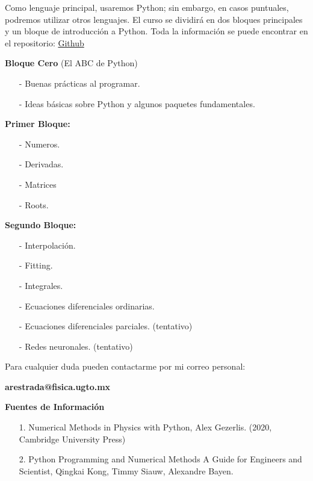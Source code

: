 \documentclass[12pt]{amsart} %
\begin{document}
Como lenguaje principal, usaremos Python; sin embargo, en casos puntuales, podremos utilizar otros lenguajes. El curso se dividirá en dos bloques principales y un bloque de introducción a Python. Toda la información se puede encontrar en el repositorio: \href{https://github.com/Mandy8808/Metodos_Numericos_2024.git}{Github}

\vspace{8pt}

\textbf{Bloque Cero} (El ABC de Python)
\begin{enumerate}
	\item[-] Buenas prácticas al programar.
	\item[-] Ideas básicas sobre Python y algunos paquetes fundamentales.
\end{enumerate}

\textbf{Primer Bloque:}
\begin{itemize}
	\item[-] Numeros.
	\item[-] Derivadas.
	\item[-] Matrices
	\item[-] Roots.
\end{itemize}

\textbf{Segundo Bloque:}
\begin{itemize}
	\item[-] Interpolación.
	\item[-] Fitting.
	\item[-] Integrales.
	\item[-] Ecuaciones diferenciales ordinarias.
	\item[-] Ecuaciones diferenciales parciales. (tentativo)
	\item[-] Redes neuronales. (tentativo)
\end{itemize}

\vspace{14pt}

Para cualquier duda pueden contactarme por mi correo personal:

\vspace{4pt}

\textbf{arestrada@fisica.ugto.mx} 

\vspace*{22pt} %

\textbf{Fuentes de Información}
\vspace{10pt}
\begin{itemize}
	\item[1.] Numerical Methods in Physics with Python, Alex Gezerlis. (2020, Cambridge University Press)
	\item[2.] Python Programming and Numerical Methods A Guide for Engineers and Scientist, Qingkai Kong, Timmy Siauw, Alexandre Bayen.
\end{itemize}
\end{document}
